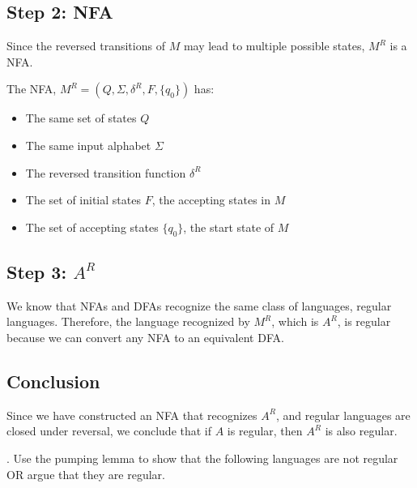 \documentclass[12pt]{article}
\newcounter{quesnum}
\newcommand{\question}[2][??]{
\begin{list}{\labelitemi}{\leftmargin=2em}
\item [\arabic{quesnum}.] {} {#2}
\end{list}
\addtocounter{quesnum}{1}
}
\begin{document}
\subsection*{Step 2: NFA}
Since the reversed transitions of \( M\) may lead to multiple possible states, \( M^R \) is a NFA.

The NFA, \( M^R = (Q, \Sigma, \delta^R, F, \{q_0\}) \) has:
\begin{itemize}
    \item The same set of states \( Q \)
    \item The same input alphabet \( \Sigma \)
    \item The reversed transition function \( \delta^R \)
    \item The set of initial states \( F \), the accepting states in \( M \)
    \item The set of accepting states \( \{q_0\} \), the start state of \( M \)
\end{itemize}

\subsection*{Step 3: \( A^R \)}
We know that NFAs and DFAs recognize the same class of languages, regular languages. Therefore, the language recognized by \( M^R \), which is \( A^R \), is regular because we can convert any NFA to an equivalent DFA.

\subsection*{Conclusion}
Since we have constructed an NFA that recognizes \( A^R \), and regular languages are closed under reversal, we conclude that if \( A \) is regular, then \( A^R \) is also regular.

\vspace{12pt}

\question[3]{
Use the pumping lemma to show that the following languages are not regular OR argue that they are regular. 
}
\end{document}
